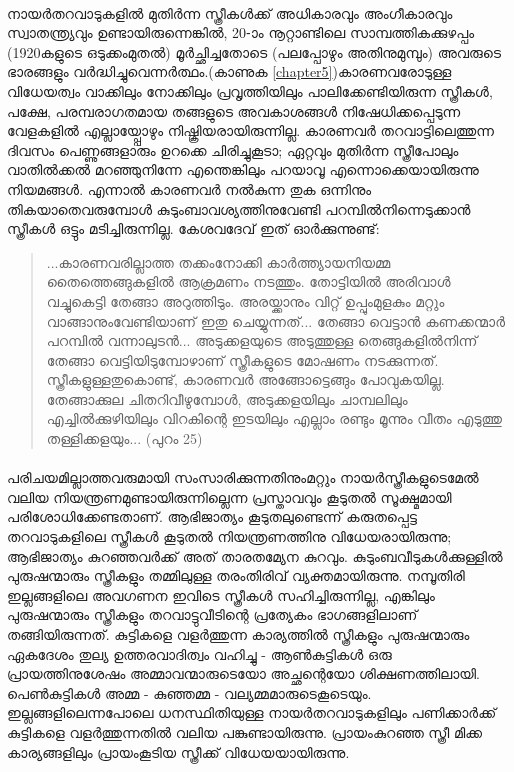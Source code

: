 \paragraph{}നായർതറവാടുകളിൽ മുതിർന്ന സ്ത്രീകൾക്ക് അധികാരവും അംഗീകാരവും സ്വാതന്ത്ര്യവും ഉണ്ടായിരുന്നെങ്കിൽ, 20-ാം നൂറ്റാണ്ടിലെ സാമ്പത്തികക്കുഴപ്പം (1920കളുടെ ഒടുക്കംമുതൽ) മൂർച്ഛിച്ചതോടെ (പലപ്പോഴും അതിനുമുമ്പും) അവരുടെ ഭാരങ്ങളും വർദ്ധിച്ചുവെന്നർത്ഥം.(കാണുക \ref{chapter5})കാരണവരോടുള്ള വിധേയത്വം വാക്കിലും നോക്കിലും പ്രവൃത്തിയിലും പാലിക്കേണ്ടിയിരുന്ന സ്ത്രീകൾ, പക്ഷേ, പരമ്പരാഗതമായ തങ്ങളുടെ അവകാശങ്ങൾ നിഷേധിക്കപ്പെടുന്ന വേളകളിൽ എല്ലായ്പ്പോഴും നിഷ്ക്രിയരായിരുന്നില്ല. കാരണവർ തറവാട്ടിലെത്തുന്ന ദിവസം പെണ്ണുങ്ങളാരും ഉറക്കെ ചിരിച്ചുകൂടാ; ഏറ്റവും മുതിർന്ന സ്ത്രീപോലും വാതിൽക്കൽ മറഞ്ഞുനിന്നേ എന്തെങ്കിലും പറയാവൂ എന്നൊക്കെയായിരുന്നു നിയമങ്ങൾ. എന്നാൽ കാരണവർ നൽകുന്ന തുക ഒന്നിനും തികയാതെവരുമ്പോൾ കുടുംബാവശ്യത്തിനുവേണ്ടി പറമ്പിൽനിന്നെടുക്കാൻ സ്ത്രീകൾ ഒട്ടും മടിച്ചിരുന്നില്ല. കേശവദേവ് ഇത് ഓർക്കുന്നുണ്ട്:
\begin{quotation}
...കാരണവരില്ലാത്ത തക്കംനോക്കി കാർത്ത്യായനിയമ്മ തൈത്തെങ്ങുകളിൽ ആക്രമണം നടത്തും. തോട്ടിയിൽ അരിവാൾ വച്ചുകെട്ടി തേങ്ങാ അറുത്തിടും. അരയ്ക്കാനും വിറ്റ് ഉപ്പുംമുളകും മറ്റും വാങ്ങാനുംവേണ്ടിയാണ് ഇതു ചെയ്യുന്നത്... തേങ്ങാ വെട്ടാൻ കണക്കന്മാർ പറമ്പിൽ വന്നാലുടൻ... അടുക്കളയുടെ അടുത്തുള്ള തെങ്ങുകളിൽനിന്ന് തേങ്ങാ വെട്ടിയിടുമ്പോഴാണ് സ്ത്രീകളുടെ മോഷണം നടക്കുന്നത്. സ്ത്രീകളുള്ളതുകൊണ്ട്, കാരണവർ അങ്ങോട്ടെങ്ങും പോവുകയില്ല. തേങ്ങാക്കുല ചിതറിവീഴുമ്പോൾ, അടുക്കളയിലും ചാമ്പലിലും എച്ചിൽക്കുഴിയിലും വിറകിന്റെ ഇടയിലും എല്ലാം രണ്ടും മൂന്നും വീതം എടുത്തു തള്ളിക്കളയും... (പുറം 25)

\end{quotation}

\paragraph{}പരിചയമില്ലാത്തവരുമായി സംസാരിക്കുന്നതിനുംമറ്റും നായർസ്ത്രീകളുടെമേൽ വലിയ നിയന്ത്രണമുണ്ടായിരുന്നില്ലെന്ന പ്രസ്താവവും കൂടുതൽ സൂക്ഷ്മമായി പരിശോധിക്കേണ്ടതാണ്. ആഭിജാത്യം കൂടുതലുണ്ടെന്ന് കരുതപ്പെട്ട തറവാടുകളിലെ സ്ത്രീകൾ കൂടുതൽ നിയന്ത്രണത്തിനു വിധേയരായിരുന്നു; ആഭിജാത്യം കുറഞ്ഞവർക്ക് അത് താരതമ്യേന കുറവും. കുടുംബവീടുകൾക്കുള്ളിൽ പുരുഷന്മാരും സ്ത്രീകളും തമ്മിലുള്ള തരംതിരിവ് വ്യക്തമായിരുന്നു. നമ്പൂതിരി ഇല്ലങ്ങളിലെ അവഗണന ഇവിടെ സ്ത്രീകൾ സഹിച്ചിരുന്നില്ല, എങ്കിലും പുരുഷന്മാരും സ്ത്രീകളും തറവാട്ടുവീടിന്റെ പ്രത്യേകം ഭാഗങ്ങളിലാണ് തങ്ങിയിരുന്നത്. കുട്ടികളെ വളർത്തുന്ന കാര്യത്തിൽ സ്ത്രീകളും പുരുഷന്മാരും ഏകദേശം തുല്യ ഉത്തരവാദിത്വം വഹിച്ചു - ആൺകുട്ടികൾ ഒരു പ്രായത്തിനുശേഷം അമ്മാവന്മാരുടെയോ അച്ഛന്റെയോ ശിക്ഷണത്തിലായി. പെൺകുട്ടികൾ അമ്മ - കുഞ്ഞമ്മ - വല്യമ്മമാരുടെകൂടെയും. ഇല്ലങ്ങളിലെന്നപോലെ ധനസ്ഥിതിയുള്ള നായർതറവാടുകളിലും പണിക്കാർക്ക് കുട്ടികളെ വളർത്തുന്നതിൽ വലിയ പങ്കുണ്ടായിരുന്നു. പ്രായംകുറഞ്ഞ സ്ത്രീ മിക്ക കാര്യങ്ങളിലും പ്രായംകൂടിയ സ്ത്രീക്ക് വിധേയയായിരുന്നു.


